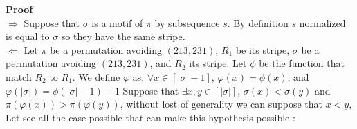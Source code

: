 \documentclass[12pt, a4paper]{article}
\newcommand{\ptext}{\pi}
\newcommand{\pmotif}{\sigma}
\begin{document}
		\textbf{Proof} \\
		$\Rightarrow$ Suppose that $\pmotif$ is a motif of $\ptext$
		by subsequence $s$.
		By definition $s$ normalized is equal to
		$\pmotif$ so they have the same stripe.\\ 
		$\Leftarrow$ 
		Let $\ptext$ be a permutation avoiding $(213,231)$, 
		$R_1$ be its stripe, 
		$\pmotif$  be a permutation avoiding $(213,231)$, 
		and $R_2$ its stripe.
		Let $\phi$ be the function
		that match $R_2$ to $R_1$.
		We define $\varphi$ as, 
		$\forall x \in [|\pmotif|-1]$,
		$\varphi(x) = \phi(x)$,
		and $\varphi(|\pmotif|) = \phi(|\pmotif|-1)+1$
		Suppose that $\exists x,y \in [|\pmotif|]$, 
		$\pmotif(x)<\pmotif(y)$ 
		and $\ptext(\varphi(x))>\ptext(\varphi(y))$,
		without lost of generality we can suppose that $x<y$,
		Let see all the case possible that can make this 
		hypothesis possible :
\end{document}
